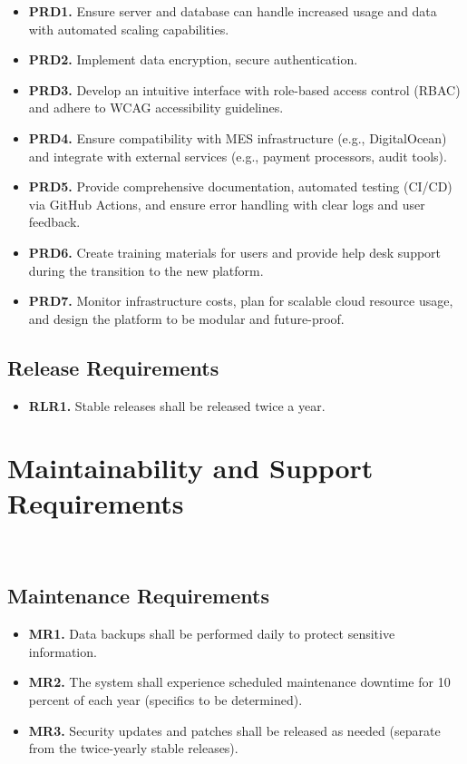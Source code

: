 \documentclass[12pt]{article}
\begin{document}
\begin{itemize}
    \item \textbf{PRD1.} Ensure server and database can handle increased usage and data with automated scaling capabilities.
    \item \textbf{PRD2.} Implement data encryption, secure authentication.
    \item \textbf{PRD3.} Develop an intuitive interface with role-based access control (RBAC) and adhere to WCAG accessibility guidelines.
    \item \textbf{PRD4.} Ensure compatibility with MES infrastructure (e.g., DigitalOcean) and integrate with external services (e.g., payment processors, audit tools).
    \item \textbf{PRD5.} Provide comprehensive documentation, automated testing (CI/CD) via GitHub Actions, and ensure error handling with clear logs and user feedback.
    \item \textbf{PRD6.} Create training materials for users and provide help desk support during the transition to the new platform.
    \item \textbf{PRD7.} Monitor infrastructure costs, plan for scalable cloud resource usage, and design the platform to be modular and future-proof.
\end{itemize}

\subsection{Release Requirements}

\label{RLR}

\begin{itemize}
    \item \textbf{RLR1.} Stable releases shall be released twice a year.
\end{itemize}

\section{Maintainability and Support Requirements}\

\label{MaintainSupport}

\subsection{Maintenance Requirements}

\label{MR}

\begin{itemize}
    \item \textbf{MR1.} Data backups shall be performed daily to protect sensitive information.
    \item \textbf{MR2.} The system shall experience scheduled maintenance downtime for 10 percent of each year (specifics to be determined).
    \item \textbf{MR3.} Security updates and patches shall be released as needed (separate from the twice-yearly stable releases).
\end{itemize}
\end{document}
